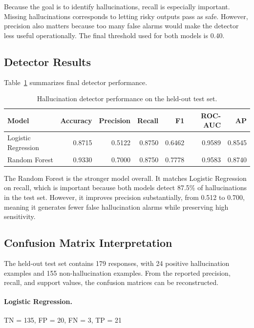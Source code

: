 \documentclass[11pt]{article}
\begin{document}
Because the goal is to identify hallucinations, recall is especially important. Missing hallucinations corresponds to letting risky outputs pass as safe. However, precision also matters because too many false alarms would make the detector less useful operationally. The final threshold used for both models is 0.40.

\subsection{Detector Results}
Table~\ref{tab:detector-results} summarizes final detector performance.

\begin{table}[H]
\centering
\caption{Hallucination detector performance on the held-out test set.}
\label{tab:detector-results}
\begin{tabular}{lrrrrrr}
\toprule
Model & Accuracy & Precision & Recall & F1 & ROC-AUC & AP \\
\midrule
Logistic Regression & 0.8715 & 0.5122 & 0.8750 & 0.6462 & 0.9589 & 0.8545 \\
Random Forest & 0.9330 & 0.7000 & 0.8750 & 0.7778 & 0.9583 & 0.8740 \\
\bottomrule
\end{tabular}
\end{table}

The Random Forest is the stronger model overall. It matches Logistic Regression on recall, which is important because both models detect 87.5\% of hallucinations in the test set. However, it improves precision substantially, from 0.512 to 0.700, meaning it generates fewer false hallucination alarms while preserving high sensitivity.

\subsection{Confusion Matrix Interpretation}
The held-out test set contains 179 responses, with 24 positive hallucination examples and 155 non-hallucination examples. From the reported precision, recall, and support values, the confusion matrices can be reconstructed.

\paragraph{Logistic Regression.}
\begin{center}
TN = 135, \quad FP = 20, \quad FN = 3, \quad TP = 21
\end{center}
\end{document}
